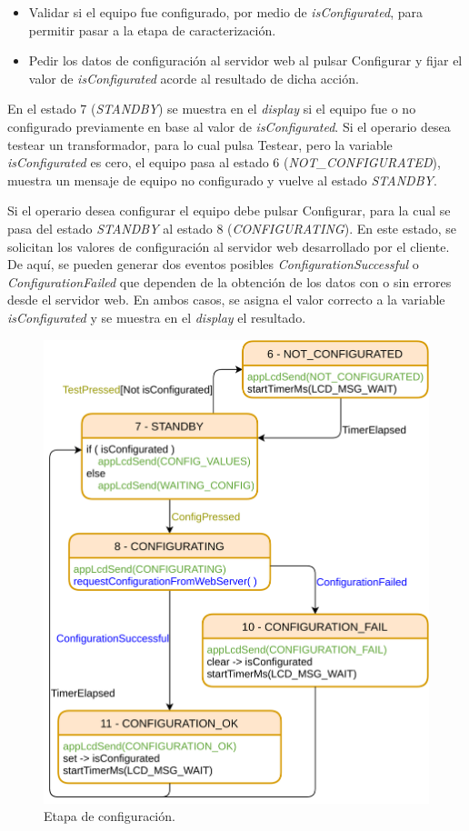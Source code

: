 \begin{itemize}
\item Validar si el equipo fue configurado, por medio de \textit{isConfigurated}, para permitir pasar a la etapa de caracterización.
\item Pedir los datos de configuración al servidor web al pulsar Configurar y fijar el valor de \textit{isConfigurated} acorde al resultado de dicha acción.
\end{itemize}

En el estado 7 (\textit{STANDBY}) se muestra en el \textit{display} si el equipo fue o no configurado previamente en base al valor de \textit{isConfigurated}. Si el operario desea testear un transformador, para lo cual pulsa Testear, pero la variable \textit{isConfigurated} es cero, el equipo pasa al estado 6 (\textit{NOT\_CONFIGURATED}), muestra un mensaje de equipo no configurado y vuelve al estado \textit{STANDBY}.

Si el operario desea configurar el equipo debe pulsar Configurar, para la cual se pasa del estado \textit{STANDBY} al estado 8 (\textit{CONFIGURATING}). En este estado, se solicitan los valores de configuración al servidor web desarrollado por el cliente. De aquí, se pueden generar dos eventos posibles \textit{ConfigurationSuccessful} o \textit{ConfigurationFailed} que dependen de la obtención de los datos con o sin errores desde el servidor web. En ambos casos, se asigna el valor correcto a la variable \textit{isConfigurated} y se muestra en el \textit{display} el resultado.

\begin{figure}[ht]
	\centering
	\includegraphics[scale=1]{./Figures/MainFSM_2.png}
	\caption{Etapa de configuración.}
	\label{fig:MainFSM_2}
\end{figure}

